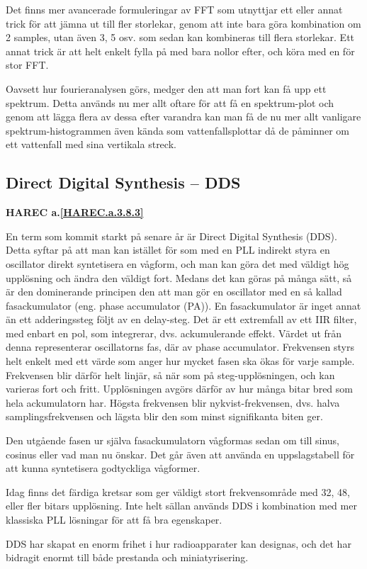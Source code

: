 Det finns mer avancerade formuleringar av FFT som utnyttjar ett eller annat
trick för att jämna ut till fler storlekar, genom att inte bara göra
kombination om 2 samples, utan även 3, 5 osv. som sedan kan kombineras till
flera storlekar.
Ett annat trick är att helt enkelt fylla på med bara nollor efter, och köra
med en för stor FFT.

Oavsett hur fourieranalysen görs, medger den att man fort kan få upp ett
spektrum.
Detta används nu mer allt oftare för att få en spektrum-plot och genom att
lägga flera av dessa efter varandra kan man få de nu mer allt vanligare
spektrum-histogrammen även kända som vattenfallsplottar då de påminner om ett
vattenfall med sina vertikala streck.

\subsection{Direct Digital Synthesis -- DDS}
\textbf{HAREC a.\ref{HAREC.a.3.8.3}\label{myHAREC.a.3.8.3}}

En term som kommit starkt på senare år är Direct Digital Synthesis (DDS).
Detta syftar på att man kan istället för som med en PLL indirekt styra en
oscillator direkt syntetisera en vågform, och man kan göra det med väldigt
hög upplösning och ändra den väldigt fort.
Medans det kan göras på många sätt, så är den dominerande principen den att
man gör en oscillator med en så kallad fasackumulator (eng. phase accumulator
(PA)).
En fasackumulator är inget annat än ett adderingssteg följt av en delay-steg.
Det är ett extremfall av ett IIR filter, med enbart en pol, som integrerar,
dvs. ackumulerande effekt.
Värdet ut från denna representerar oscillatorns fas, där av phase accumulator.
Frekvensen styrs helt enkelt med ett värde som anger hur mycket fasen ska
ökas för varje sample.
Frekvensen blir därför helt linjär, så när som på steg-upplösningen, och kan
varieras fort och fritt.
Upplösningen avgörs därför av hur många bitar bred som hela ackumulatorn har.
Högsta frekvensen blir nykvist-frekvensen, dvs. halva samplingsfrekvensen och
lägsta blir den som minst signifikanta biten ger.

Den utgående fasen ur själva fasackumulatorn vågformas sedan om till sinus,
cosinus eller vad man nu önskar. Det går även att använda en uppslagstabell
för att kunna syntetisera godtyckliga vågformer.

Idag finns det färdiga kretsar som ger väldigt stort frekvensområde med 32, 48,
eller fler bitars upplösning.
Inte helt sällan används DDS i kombination med mer klassiska PLL lösningar
för att få bra egenskaper.

DDS har skapat en enorm frihet i hur radioapparater kan designas, och det har
bidragit enormt till både prestanda och miniatyrisering.
